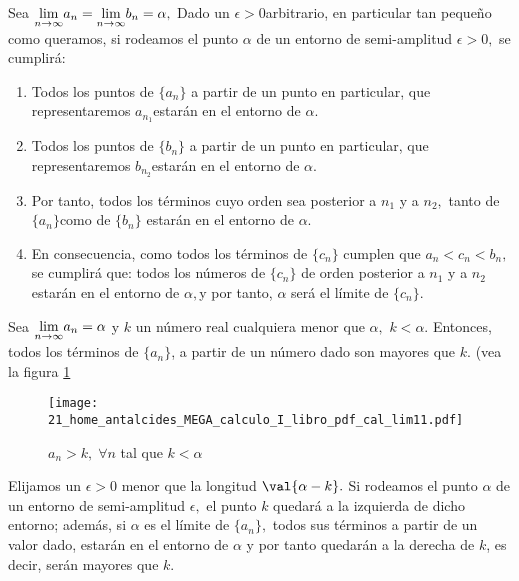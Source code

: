 \begin{dems}

Sea $\Lim{a_{n}}n{\infty}=\Lim{b_{n}}n{\infty}=\alpha,$ Dado un $\epsilon>0$arbitrario,
en particular tan pequeño como queramos, si rodeamos el punto $\alpha$
de un entorno de semi-amplitud $\epsilon>0,$ se cumplirá:
\begin{enumerate}
\item Todos los puntos de $\{a_{n}\}$ a partir de un punto en particular,
que representaremos $a_{n_{1}}$estarán en el entorno de $\alpha.$
\item Todos los puntos de $\{b_{n}\}$ a partir de un punto en particular,
que representaremos $b_{n_{2}}$estarán en el entorno de $\alpha.$
\item Por tanto, todos los términos cuyo orden sea posterior a $n_{1}$
y a $n_{2},$ tanto de $\{a_{n}\}$como de $\{b_{n}\}$ estarán en
el entorno de $\alpha.$
\item En consecuencia, como todos los términos de $\{c_{n}\}$ cumplen que
$a_{n}<c_{n}<b_{n},$ se cumplirá que: todos los números de $\{c_{n}\}$
de orden posterior a $n_{1}$ y a $n_{2}$estarán en el entorno de
$\alpha,$y por tanto, $\alpha$ será el límite de $\{c_{n}\}.$
\end{enumerate}
\end{dems}

\begin{propiedad}{}

Sea $\Lim{a_{n}}n{\infty}=\alpha$ y $k$ un número real cualquiera
menor que $\alpha,$ $k<\alpha.$ Entonces, todos los términos de
$\{a_{n}\}$, a partir de un número dado son mayores que $k.$ (vea
la figura \ref{fig:cal_lim11} 

\end{propiedad}

\begin{figure}[H] \centering

\texttt{[image: 21\_home\_antalcides\_MEGA\_calculo\_I\_libro\_pdf\_cal\_lim11.pdf]}
\caption{$a_n>k,\;\forall n$ tal que $k<\alpha $}
\label{fig:cal_lim11} \end{figure}

\begin{dems}

Elijamos un $\epsilon>0$ menor que la longitud $\val{\alpha-k}.$
Si rodeamos el punto $\alpha$ de un entorno de semi-amplitud $\epsilon,$
el punto $k$ quedará a la izquierda de dicho entorno; además, si
$\alpha$ es el límite de $\{a_{n}\},$ todos sus términos a partir
de un valor dado, estarán en el entorno de $\alpha$ y por tanto quedarán
a la derecha de $k$, es decir, serán mayores que $k.$ 

\end{dems}

